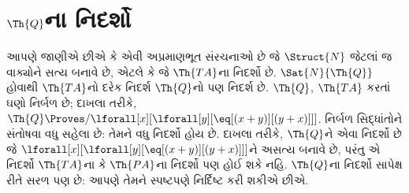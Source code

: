 \begingroup
\makeatletter{}\makeatother

\section{$\Th{Q}$ના નિદર્શો}
\label{guunit:OLP-0195}


\begin{explain}
આપણે જાણીએ છીએ કે એવી અપ્રમાણભૂત સંરચનાઓ છે જે
$\Struct{N}$ જેટલાં જ વાક્યોને સત્ય બનાવે છે, એટલે કે જે
$\Th{TA}$ના નિદર્શો છે. $\Sat{N}{\Th{Q}}$ હોવાથી $\Th{TA}$નો દરેક
નિદર્શ $\Th{Q}$નો પણ નિદર્શ છે. $\Th{Q}$, $\Th{TA}$ કરતાં ઘણો
નિર્બળ છે; દાખલા તરીકે,
$\Th{Q}\Proves/\lforall[x][\lforall[y][\eq[(x+y)][(y+x)]]]$.
નિર્બળ સિદ્ધાંતોને સંતોષવા વધુ સહેલા છે: તેમને વધુ નિદર્શો હોય છે.
દાખલા તરીકે, $\Th{Q}$ને એવા નિદર્શો છે જે
$\lforall[x][\lforall[y][\eq[(x+y)][(y+x)]]]$ને અસત્ય બનાવે છે, પરંતુ
એ નિદર્શો $\Th{TA}$ના કે $\Th{PA}$ના નિદર્શો પણ હોઈ શકે નહિ.
$\Th{Q}$ના નિદર્શો સાપેક્ષ રીતે સરળ પણ છે: આપણે તેમને સ્પષ્ટપણે
નિર્દિષ્ટ કરી શકીએ છીએ.
\end{explain}

